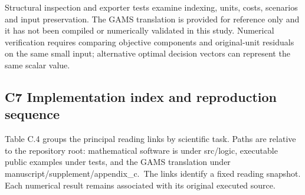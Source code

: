 \documentclass[
  english,
  11pt,
  a4paper,
]{article}
\begin{document}
Structural inspection and exporter tests examine indexing, units, costs,
scenarios and input preservation. The GAMS translation is provided for reference only and it has not
been compiled or numerically validated in this study. Numerical verification requires comparing objective components and original-unit residuals on the same
small input; alternative optimal decision vectors can represent the same scalar value.

\subsection{C7 Implementation index and reproduction
sequence}\label{c7-implementation-index-and-reproduction-sequence}

Table C.4 groups the principal reading links by scientific task. Paths
are relative to the repository root: mathematical software is under
src/logic, executable public examples under tests, and the GAMS
translation under manuscript/supplement/appendix\_c.~The links identify
a fixed reading snapshot. Each numerical result remains associated with
its original executed source.
\end{document}
